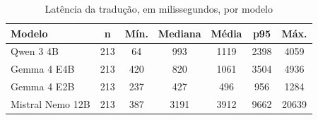 \begin{table}[htbp!]
\centering
\caption{Latência da tradução, em milissegundos, por modelo}
\label{tab:latencia}
\small
\begin{tabular}{|l|c|c|c|c|c|c|}
\hline
\textbf{Modelo} & \textbf{n} & \textbf{Mín.} & \textbf{Mediana} & \textbf{Média} & \textbf{p95} & \textbf{Máx.} \\
\hline
Qwen 3 4B & 213 & 64 & 993 & 1119 & 2398 & 4059 \\
Gemma 4 E4B & 213 & 420 & 820 & 1061 & 3504 & 4936 \\
Gemma 4 E2B & 213 & 237 & 427 & 496 & 956 & 1284 \\
Mistral Nemo 12B & 213 & 387 & 3191 & 3912 & 9662 & 20639 \\
\hline
\end{tabular}
\end{table}
